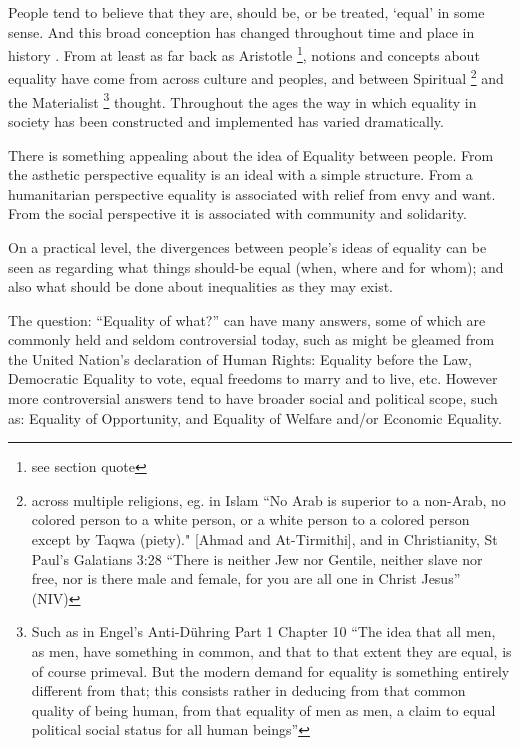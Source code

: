 People tend to believe that they are, should be, or be treated, `equal' in some sense.
And this broad conception has changed throughout time and place in history \cite{themeaningofequalitycapaldi}.
From at least as far back as Aristotle \cite{AristotleGutenberg}\footnote{see section quote}, notions and concepts about equality have come from across culture and peoples, and between Spiritual \footnote{across multiple religions, eg. in Islam ``No Arab is superior to a non-Arab, no colored person to a  white person, or a white person to a colored person except by Taqwa (piety)." [Ahmad and At-Tirmithi], and in Christianity, St Paul's Galatians 3:28 ``There is neither Jew nor Gentile, neither slave nor free, nor is there male and female, for you are all one in Christ Jesus'' (NIV) } and the Materialist \footnote{Such as in Engel's Anti-D\"{u}hring Part 1 Chapter 10 ``The idea that all men, as men, have something in common, and that to that extent they are equal, is of course primeval. But the modern demand for equality is something entirely different from that; this consists rather in deducing from that common quality of being human, from that equality of men as men, a claim to equal political social status for all human beings''} thought.
Throughout the ages the way in which equality in society has been constructed and implemented has varied dramatically.%

There is something appealing about the idea of Equality between people.
From the asthetic perspective equality is an ideal with a simple structure. From a humanitarian perspective equality is associated with relief from envy and want. From the social perspective it is associated with community and solidarity.%


On a practical level, the divergences between people's ideas of equality can be seen as regarding what things should-be equal (when, where and for whom); and also what should be done about inequalities as they may exist.

The question: ``Equality of what?'' can have many answers, some of which are commonly held and seldom controversial today, such as might be gleamed from the United Nation's declaration of Human Rights: Equality before the Law, Democratic Equality to vote, equal freedoms to marry and to live, etc.
However more controversial answers tend to have broader social and political scope, such as: Equality of Opportunity, and Equality of Welfare and/or Economic Equality.%

